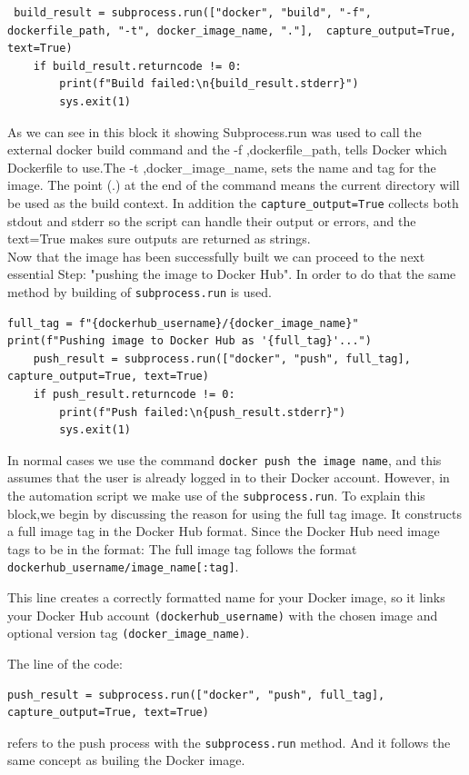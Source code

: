 \begin{lstlisting}
 build_result = subprocess.run(["docker", "build", "-f", dockerfile_path, "-t", docker_image_name, "."],  capture_output=True, text=True)
    if build_result.returncode != 0:
        print(f"Build failed:\n{build_result.stderr}")
        sys.exit(1)
\end{lstlisting}

As we can see in this block it showing Subprocess.run was used  to call the external docker build command and the -f ,dockerfile\_path, tells Docker which Dockerfile to use.The  -t ,docker\_image\_name, sets the name and tag for the image. The point (.) at the end of the command means the current directory will be used as the build context. In addition the \texttt{capture\_output=True} collects both stdout and stderr so the script can handle their output or errors, and the text=True makes sure outputs are returned as strings.
\\Now that the image has been successfully built we can proceed to the next essential Step: "pushing the image to Docker Hub". In order to do that the same method by building of \texttt{subprocess.run} is used.


\begin{lstlisting}
full_tag = f"{dockerhub_username}/{docker_image_name}"
print(f"Pushing image to Docker Hub as '{full_tag}'...")
    push_result = subprocess.run(["docker", "push", full_tag], capture_output=True, text=True)
    if push_result.returncode != 0:
        print(f"Push failed:\n{push_result.stderr}")
        sys.exit(1)

\end{lstlisting}

In normal cases we use the command \texttt{docker push the image name}, and this assumes that the user is already logged in to their Docker account. However, in the automation script we make use of the \texttt{subprocess.run}. 
To explain this block,we begin by discussing the reason for using the full tag image. It constructs a full image tag in the Docker Hub format. Since the Docker Hub need image tags  to be in the format: The full image tag follows the format \texttt{dockerhub\_username/image\_name[:tag]}.

This line creates a correctly formatted name for your Docker image, so it links your Docker Hub account \texttt{(dockerhub\_username)} with the chosen image and optional version tag \texttt{(docker\_image\_name)}.

The line of the code: 
\begin{lstlisting}
push_result = subprocess.run(["docker", "push", full_tag], capture_output=True, text=True)
\end{lstlisting}
refers to the push process with the \texttt{subprocess.run} method. And it follows the same concept as builing the Docker image. 

